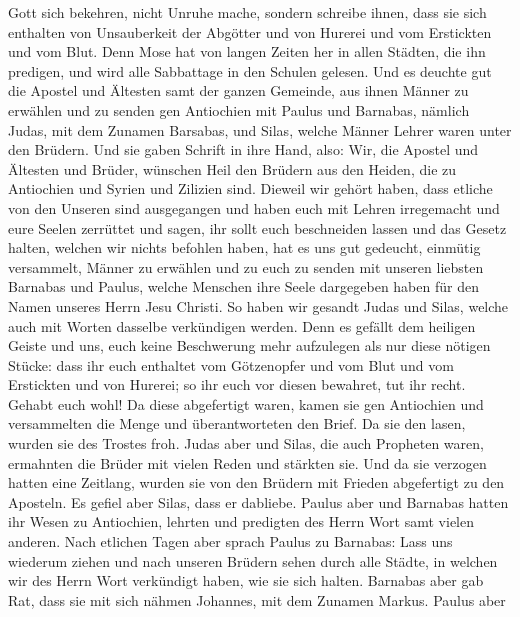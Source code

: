 Gott sich bekehren, nicht Unruhe mache,  sondern schreibe
ihnen, dass sie sich enthalten von Unsauberkeit der Abgötter und von
Hurerei und vom Erstickten und vom Blut.  Denn Mose hat von
langen Zeiten her in allen Städten, die ihn predigen, und wird alle
Sabbattage in den Schulen gelesen.  Und es deuchte gut die
Apostel und Ältesten samt der ganzen Gemeinde, aus ihnen Männer zu
erwählen und zu senden gen Antiochien mit Paulus und Barnabas, nämlich
Judas, mit dem Zunamen Barsabas, und Silas, welche Männer Lehrer waren
unter den Brüdern.  Und sie gaben Schrift in ihre Hand,
also: Wir, die Apostel und Ältesten und Brüder, wünschen Heil den
Brüdern aus den Heiden, die zu Antiochien und Syrien und Zilizien sind.
 Dieweil wir gehört haben, dass etliche von den Unseren
sind ausgegangen und haben euch mit Lehren irregemacht und eure Seelen
zerrüttet und sagen, ihr sollt euch beschneiden lassen und das Gesetz
halten, welchen wir nichts befohlen haben,  hat es uns gut
gedeucht, einmütig versammelt, Männer zu erwählen und zu euch zu senden
mit unseren liebsten Barnabas und Paulus,  welche Menschen
ihre Seele dargegeben haben für den Namen unseres Herrn Jesu Christi.
 So haben wir gesandt Judas und Silas, welche auch mit
Worten dasselbe verkündigen werden.  Denn es gefällt dem
heiligen Geiste und uns, euch keine Beschwerung mehr aufzulegen als nur
diese nötigen Stücke:  dass ihr euch enthaltet vom
Götzenopfer und vom Blut und vom Erstickten und von Hurerei; so ihr euch
vor diesen bewahret, tut ihr recht. Gehabt euch wohl!  Da
diese abgefertigt waren, kamen sie gen Antiochien und versammelten die
Menge und überantworteten den Brief.  Da sie den lasen,
wurden sie des Trostes froh.  Judas aber und Silas, die
auch Propheten waren, ermahnten die Brüder mit vielen Reden und stärkten
sie.  Und da sie verzogen hatten eine Zeitlang, wurden sie
von den Brüdern mit Frieden abgefertigt zu den Aposteln. 
Es gefiel aber Silas, dass er dabliebe.  Paulus aber und
Barnabas hatten ihr Wesen zu Antiochien, lehrten und predigten des Herrn
Wort samt vielen anderen.  Nach etlichen Tagen aber sprach
Paulus zu Barnabas: Lass uns wiederum ziehen und nach unseren Brüdern
sehen durch alle Städte, in welchen wir des Herrn Wort verkündigt haben,
wie sie sich halten.  Barnabas aber gab Rat, dass sie mit
sich nähmen Johannes, mit dem Zunamen Markus.  Paulus aber
